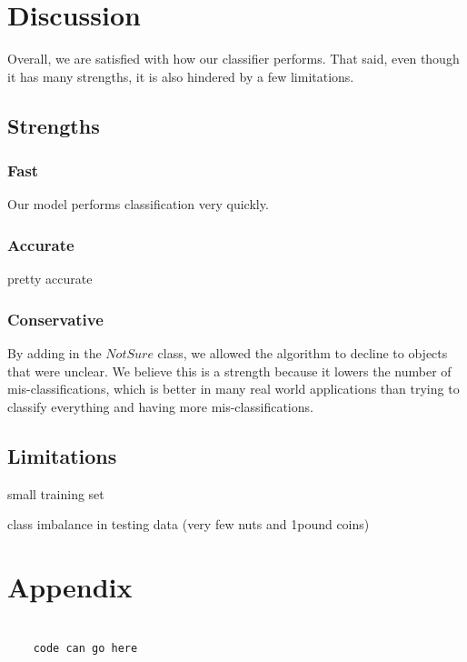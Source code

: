 \documentclass[12pt]{article}
\begin{document}
\section{Discussion}

Overall, we are satisfied with how our classifier performs. That said, even though it has many strengths, it is also hindered by a few limitations.

\subsection{Strengths}

\subsubsection{Fast}

Our model performs classification very quickly. 

\subsubsection{Accurate}

pretty accurate

\subsubsection{Conservative}

By adding in the $NotSure$ class, we allowed the algorithm to decline to objects that were unclear. We believe this is a strength because it lowers the number of mis-classifications, which is better in many real world applications than trying to classify everything and having more mis-classifications.

\subsection{Limitations}

small training set

class imbalance in testing data (very few nuts and 1pound coins)

\section*{Appendix}

\begin{verbatim}
	
	code can go here
	
\end{verbatim}
\end{document}
